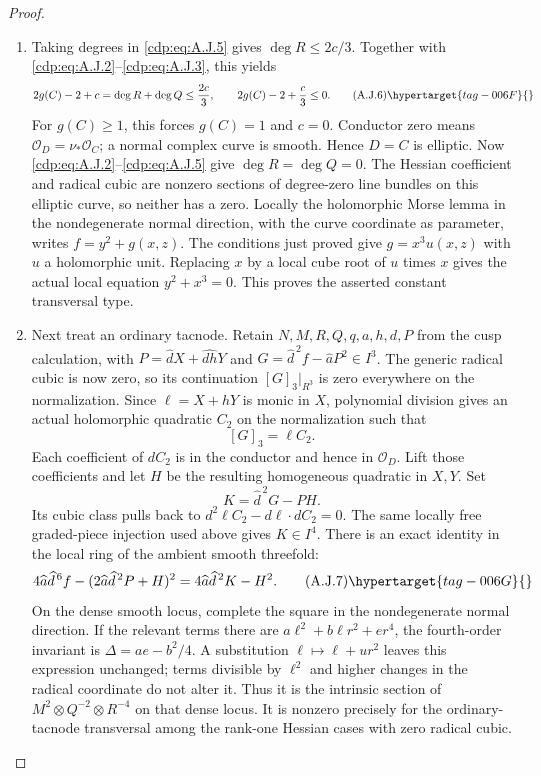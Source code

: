 \begin{proof}
\begin{enumerate}[label={$\langle1\rangle$\arabic*.},leftmargin=*]
\item Taking degrees in \eqref{cdp:eq:A.J.5} gives $\deg R\leq2c/3$.
Together with \eqref{cdp:eq:A.J.2}--\eqref{cdp:eq:A.J.3}, this yields
\[
 2g(C)-2+c=\deg R+\deg Q\leq\frac{2c}{3},
 \qquad 2g(C)-2+\frac c3\leq0.                     \tag{A.J.6}\hypertarget{tag-006F}{}\label{cdp:eq:A.J.6}
\]
For $g(C)\geq1$, this forces $g(C)=1$ and $c=0$.
Conductor zero means $\mathcal O_D=\nu_*\mathcal O_C$;
a normal complex curve is smooth. Hence $D=C$ is elliptic.
Now \eqref{cdp:eq:A.J.2}--\eqref{cdp:eq:A.J.5} give $\deg R=\deg Q=0$.
The Hessian coefficient and radical cubic are nonzero
sections of degree-zero line bundles on this elliptic curve,
so neither has a zero. Locally the holomorphic Morse lemma
in the nondegenerate normal direction, with the curve
coordinate as parameter, writes $f=y^2+g(x,z)$.
The conditions just proved give $g=x^3u(x,z)$ with $u$ a
holomorphic unit. Replacing $x$ by a local cube root of $u$
times $x$ gives the actual local equation $y^2+x^3=0$.
This proves the asserted constant transversal type.

\item Next treat an ordinary tacnode. Retain $N,M,R,Q,q,a,h,d,P$
from the cusp calculation, with
$P=\widehat d X+\widehat{dh}Y$ and
$G=\widehat d^{\,2}f-\widehat aP^2\in I^3$.
The generic radical cubic is now zero, so its continuation
$[G]_3|_{R^3}$ is zero everywhere on the normalization.
Since $\ell=X+hY$ is monic in $X$, polynomial division gives
an actual holomorphic quadratic $C_2$ on the normalization
such that
\[
 [G]_3=\ell C_2.
\]
Each coefficient of $dC_2$ is in the conductor and hence in
$\mathcal O_D$. Lift those coefficients and let $H$ be the
resulting homogeneous quadratic in $X,Y$. Set
\[
 K=\widehat d^{\,2}G-PH.
\]
Its cubic class pulls back to
$d^2\ell C_2-d\ell\cdot dC_2=0$.
The same locally free graded-piece injection used above gives
$K\in I^4$. There is an exact identity in the local ring of
the ambient smooth threefold:
\[
 4\widehat a\widehat d^{\,6}f
 -(2\widehat a\widehat d^{\,2}P+H)^2
 =4\widehat a\widehat d^{\,2}K-H^2.               \tag{A.J.7}\hypertarget{tag-006G}{}\label{cdp:eq:A.J.7}
\]
On the dense smooth locus, complete the square in the
nondegenerate normal direction. If the relevant terms there
are $a\ell^2+b\ell r^2+er^4$, the fourth-order invariant is
$\Delta=ae-b^2/4$. A substitution
$\ell\mapsto\ell+ur^2$ leaves this expression unchanged;
terms divisible by $\ell^2$ and higher changes in the radical
coordinate do not alter it. Thus it is the intrinsic section
of $M^2\otimes Q^{-2}\otimes R^{-4}$ on that dense locus.
It is nonzero precisely for the ordinary-tacnode transversal
among the rank-one Hessian cases with zero radical cubic.


\end{enumerate}
\end{proof}
